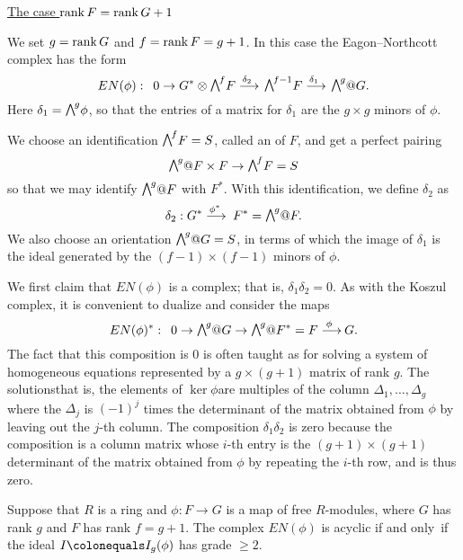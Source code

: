 \smallbreak
\noindent
\underline{The case $\operatorname{rank} F=\operatorname{rank} G + 1$}
\smallbreak

We set $g=\operatorname{rank} G$ and $f = \operatorname{rank} F = g+1$. In this case the
Eagon--Northcott complex has the form
$$
EN(\phi):\quad 0\to G^{*}\otimes \mwedge^{f}F \ruto {\delta_{2}}
\mwedge^{f-1}F \ruto {\delta_{1}} \mwedge^g@G.
$$
Here $\delta_{1} = \mwedge^{g}\phi$, so that the entries of a matrix for
$\delta_{1}$ are the $g\times g$ minors of
$\phi$.

We choose an identification $\mwedge^{f}F = S$, called an
%
of $F$, and get a perfect pairing
$$
\mwedge^{g}@F \times F \to \mwedge^{f}F = S
$$
so that we may identify
$\mwedge^{g}@F$ with $F^{*}$. With this identification, we define
$\delta_{2}$ as
$$
\delta_{2}:  G^{*}\ruto {\phi^{*}}  F^{*} = \mwedge^{g}@F.
$$
We also choose an orientation $\mwedge^{g}@G = S$, in terms of which the
image of $\delta_{1}$ is
the ideal generated by the $(f{-}1)\times (f{-}1)$  minors of $\phi$.

We first claim that $EN(\phi)$ is a complex; that is,
$\delta_{1}\delta_{2} = 0$.  As with the Koszul complex,
%
it is convenient to dualize and consider the maps
$$
EN(\phi)^{*}:\quad 0\to \mwedge^{g} @
G \to \mwedge^{g}@F^{*} = F\ruto{\,\phi} G
.
$$
The fact that this composition is 0 is often taught as 
%
for solving a system of
homogeneous equations represented by a $g\times (g+1)$ matrix of rank $g$.
The solutions\emdash that is, the elements of $\ker \phi$\emdash are
multiples of the column
$\Delta_{1}, \dots, \Delta_{g}$ where the $\Delta_{j}$ is 
$(-1)^{j}$
times the determinant
of the matrix obtained from $\phi$ by leaving out the $j$-th column. 
The composition $\delta_{1}\delta_{2}$ is zero
because the composition  is a column matrix whose $i$-th
entry is the
$(g+1)\times (g+1)$ determinant of the matrix obtained
from $\phi$ by
repeating the $i$-th row, and is thus zero.

\begin{theorem}\label{EN grade 2}
Suppose that $R$ is a ring and $\phi: F\to G$ is a map of  free
$R$-modules,
where $G$ has rank $g$ and $F$ has rank $f = g+1$.
The complex $EN(\phi)$ is acyclic if and only~if the ideal $I
\colonequals  I_{g}(\phi)$ has grade $\geq 2$.
\end{theorem}

